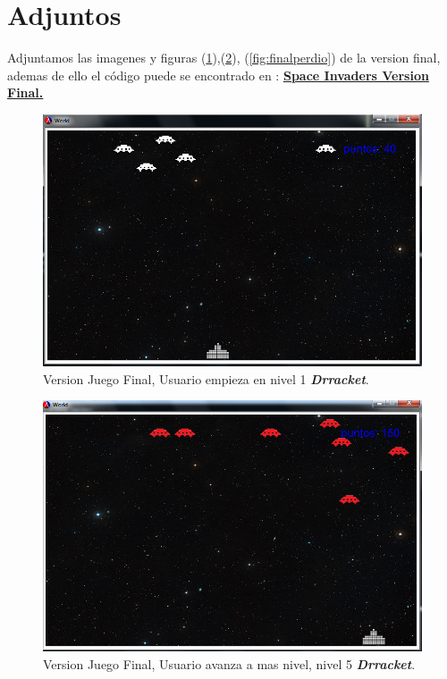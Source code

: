 \documentclass[a4paper]{article} %
\begin{document}
\clearpage
\section{Adjuntos}
Adjuntamos las imagenes y figuras (\ref{fig:inicio}),(\ref{fig:incrementonivel}), (\ref{fig:finalperdio}) de la version final, ademas de ello el código puede se encontrado en : \textbf{\href{github.com/heticor915/VideoJuego}{Space Invaders Version Final.}}
\begin{figure}
  \centering
    \includegraphics[scale=0.4]{images/inicio}
  \caption{Version Juego Final, Usuario empieza en nivel 1 \textbf{\textit{Drracket}}.}
  \label{fig:inicio}
\end{figure}

\begin{figure}
  \centering
    \includegraphics[scale=0.4]{images/nivelinc}
  \caption{Version Juego Final, Usuario avanza a mas nivel, nivel 5 \textbf{\textit{Drracket}}.}
  \label{fig:incrementonivel}
\end{figure}
\end{document}
